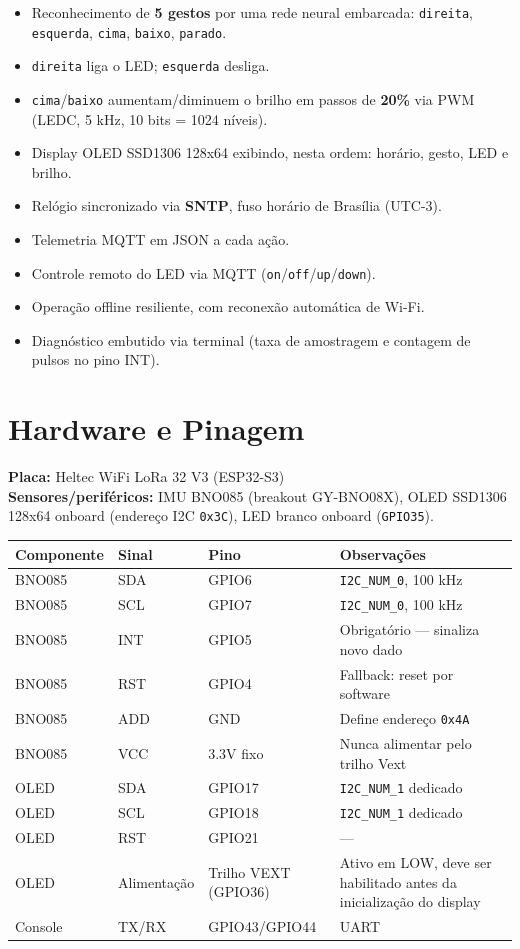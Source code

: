 \documentclass[11pt,a4paper]{article}
\begin{document}
\begin{itemize}[leftmargin=*]
    \item Reconhecimento de \textbf{5 gestos} por uma rede neural embarcada: \texttt{direita}, \texttt{esquerda}, \texttt{cima}, \texttt{baixo}, \texttt{parado}.
    \item \texttt{direita} liga o LED; \texttt{esquerda} desliga.
    \item \texttt{cima}/\texttt{baixo} aumentam/diminuem o brilho em passos de \textbf{20\%} via PWM (LEDC, 5 kHz, 10 bits = 1024 níveis).
    \item Display OLED SSD1306 128x64 exibindo, nesta ordem: horário, gesto, LED e brilho.
    \item Relógio sincronizado via \textbf{SNTP}, fuso horário de Brasília (UTC-3).
    \item Telemetria MQTT em JSON a cada ação.
    \item Controle remoto do LED via MQTT (\texttt{on}/\texttt{off}/\texttt{up}/\texttt{down}).
    \item Operação offline resiliente, com reconexão automática de Wi-Fi.
    \item Diagnóstico embutido via terminal (taxa de amostragem e contagem de pulsos no pino INT).
\end{itemize}


\section{Hardware e Pinagem}

\textbf{Placa:} Heltec WiFi LoRa 32 V3 (ESP32-S3)\\
\textbf{Sensores/periféricos:} IMU BNO085 (breakout GY-BNO08X), OLED SSD1306 128x64 onboard (endereço I2C \texttt{0x3C}), LED branco onboard (\texttt{GPIO35}).

\begin{longtable}{p{2.8cm}p{2.2cm}p{2.2cm}p{6cm}}
\toprule
\textbf{Componente} & \textbf{Sinal} & \textbf{Pino} & \textbf{Observações} \\
\midrule
\endhead
BNO085 & SDA & GPIO6 & \texttt{I2C\_NUM\_0}, 100 kHz \\
BNO085 & SCL & GPIO7 & \texttt{I2C\_NUM\_0}, 100 kHz \\
BNO085 & INT & GPIO5 & Obrigatório — sinaliza novo dado \\
BNO085 & RST & GPIO4 & Fallback: reset por software \\
BNO085 & ADD & GND & Define endereço \texttt{0x4A} \\
BNO085 & VCC & 3.3V fixo & Nunca alimentar pelo trilho Vext \\
OLED & SDA & GPIO17 & \texttt{I2C\_NUM\_1} dedicado \\
OLED & SCL & GPIO18 & \texttt{I2C\_NUM\_1} dedicado \\
OLED & RST & GPIO21 & --- \\
OLED & Alimentação & Trilho VEXT (GPIO36) & Ativo em LOW, deve ser habilitado antes da inicialização do display \\
Console & TX/RX & GPIO43/GPIO44 & UART \\
\bottomrule
\end{longtable}
\end{document}
